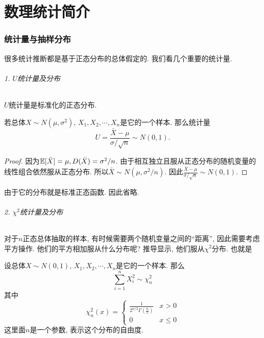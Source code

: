 \part{数理统计简介}





\section{统计量与抽样分布}

很多统计推断都是基于正态分布的总体假定的. 我们看几个重要的统计量. 

\paragraph{1. $U$统计量及分布} 

$U$统计量是标准化的正态分布. 

\begin{theorem}
    若总体$X\sim N(\mu, \sigma^2)$, $X_1, X_2, \cdots, X_n$是它的一个样本. 那么统计量
    $$
    U=\frac{\bar X-\mu}{\sigma/\sqrt n} \sim N(0, 1).
    $$
\end{theorem}

\begin{proof}
    因为$\mathbb E[\bar X]=\mu, D(\bar X)=\sigma^2 /n$. 由于相互独立且服从正态分布的随机变量的线性组合依然服从正态分布. 所以$\bar X\sim N(\mu, \sigma^2 / n)$. 因此$\frac{\bar X -\mu}{\sigma / \sqrt n}\sim N(0, 1)$.
\end{proof}

由于它的分布就是标准正态函数. 因此省略. 

\paragraph{2. $\chi^2$统计量及分布}

对于$n$正态总体抽取的样本, 有时候需要两个随机变量之间的``距离'', 因此需要考虑平方操作. 他们的平方相加服从什么分布呢? 推导显示, 他们服从$\chi^2$分布. 也就是

\begin{definition}
    设总体$X\sim N(0, 1)$, $X_1, X_2, \cdots, X_n$是它的一个样本. 那么
    $$
    \sum_{i=1}^n X_i ^2 \sim \chi^2_n
    $$
    其中
    $$
    \chi^2_n(x)=\begin{cases}
        \frac{1}{2^{n/2}\Gamma\left(\frac n2\right)} & x>0\\
        0 & x\leq 0
    \end{cases}
    $$
    这里面$n$是一个参数, 表示这个分布的自由度. 
\end{definition}

